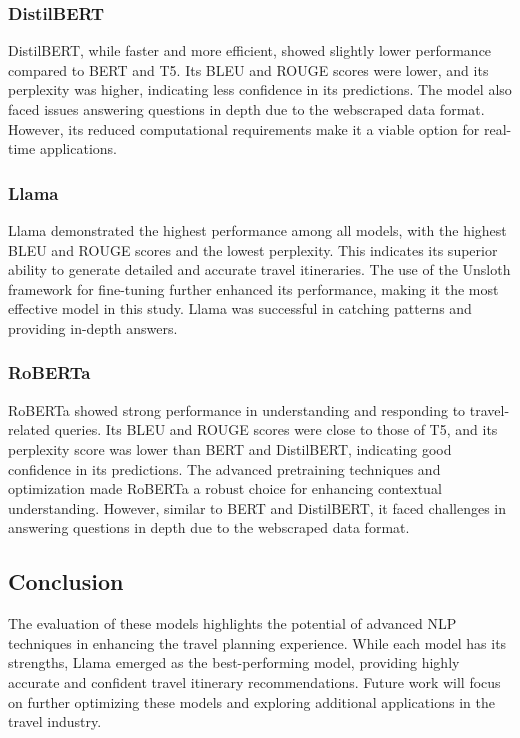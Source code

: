 \documentclass[conference]{IEEEtran}
\begin{document}
\subsubsection{DistilBERT}

DistilBERT, while faster and more efficient, showed slightly lower performance compared to BERT and T5. Its BLEU and ROUGE scores were lower, and its perplexity was higher, indicating less confidence in its predictions. The model also faced issues answering questions in depth due to the webscraped data format. However, its reduced computational requirements make it a viable option for real-time applications.

\subsubsection{Llama}

Llama demonstrated the highest performance among all models, with the highest BLEU and ROUGE scores and the lowest perplexity. This indicates its superior ability to generate detailed and accurate travel itineraries. The use of the Unsloth framework for fine-tuning further enhanced its performance, making it the most effective model in this study. Llama was successful in catching patterns and providing in-depth answers.

\subsubsection{RoBERTa}

RoBERTa showed strong performance in understanding and responding to travel-related queries. Its BLEU and ROUGE scores were close to those of T5, and its perplexity score was lower than BERT and DistilBERT, indicating good confidence in its predictions. The advanced pretraining techniques and optimization made RoBERTa a robust choice for enhancing contextual understanding. However, similar to BERT and DistilBERT, it faced challenges in answering questions in depth due to the webscraped data format.

\subsection{Conclusion}

The evaluation of these models highlights the potential of advanced NLP techniques in enhancing the travel planning experience. While each model has its strengths, Llama emerged as the best-performing model, providing highly accurate and confident travel itinerary recommendations. Future work will focus on further optimizing these models and exploring additional applications in the travel industry.
\end{document}
